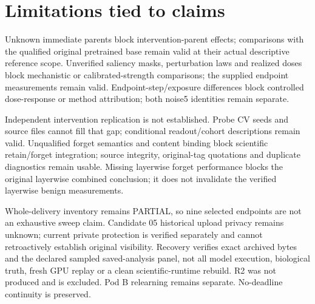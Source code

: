 \documentclass[11pt]{article}
\begin{document}
\section{Limitations tied to claims}
Unknown immediate parents block intervention-parent effects; comparisons with the qualified original pretrained base remain valid at their actual descriptive reference scope. Unverified saliency masks, perturbation laws and realized doses block mechanistic or calibrated-strength comparisons; the supplied endpoint measurements remain valid. Endpoint-step/exposure differences block controlled dose-response or method attribution; both noise5 identities remain separate.\par
Independent intervention replication is not established. Probe CV seeds and source files cannot fill that gap; conditional readout/cohort descriptions remain valid. Unqualified forget semantics and content binding block scientific retain/forget integration; source integrity, original-tag quotations and duplicate diagnostics remain usable. Missing layerwise forget performance blocks the original layerwise combined conclusion; it does not invalidate the verified layerwise benign measurements.\par
Whole-delivery inventory remains PARTIAL, so nine selected endpoints are not an exhaustive sweep claim. Candidate 05 historical upload privacy remains unknown; current private protection is verified separately and cannot retroactively establish original visibility. Recovery verifies exact archived bytes and the declared sampled saved-analysis panel, not all model execution, biological truth, fresh GPU replay or a clean scientific-runtime rebuild. R2 was not produced and is excluded. Pod B relearning remains separate. No-deadline continuity is preserved.\par
\end{document}
